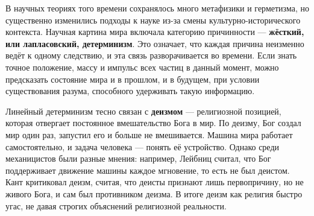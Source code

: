 
В научных теориях того времени сохранялось много метафизики и герметизма, но существенно изменились подходы к науке из-за смены культурно-исторического контекста. Научная картина мира включала категорию причинности --- \textbf{жёсткий, или лапласовский, детерминизм}. Это означает, что каждая причина неизменно ведёт к одному следствию, и эта связь разворачивается во времени. Если знать точное положение, массу и импульс всех частиц в данный момент, можно предсказать состояние мира и в прошлом, и в будущем, при условии существования разума, способного удерживать такую информацию.

Линейный детерминизм тесно связан с \textbf{деизмом} --- религиозной позицией, которая отвергает постоянное вмешательство Бога в мир. По деизму, Бог создал мир один раз, запустил его и больше не вмешивается. Машина мира работает самостоятельно, и задача человека --- понять её устройство. Однако среди механицистов были разные мнения: например, Лейбниц считал, что Бог поддерживает движение машины каждое мгновение, то есть не был деистом. Кант критиковал деизм, считая, что деисты признают лишь первопричину, но не живого Бога, и сам был противником деизма. В итоге деизм как религия быстро угас, не давая строгих объяснений религиозной реальности.

